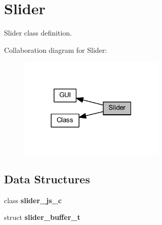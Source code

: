 \section{Slider}
\label{group___slider}


Slider class definition.  


Collaboration diagram for Slider\+:\nopagebreak
\begin{figure}[H]
\begin{center}
\leavevmode
\includegraphics[width=198pt]{group___slider}
\end{center}
\end{figure}
\subsection*{Data Structures}
\begin{DoxyCompactItemize}
\item 
class \textbf{ slider\+\_\+js\+\_\+c}
\item 
struct \textbf{ slider\+\_\+buffer\+\_\+t}
\end{DoxyCompactItemize}
